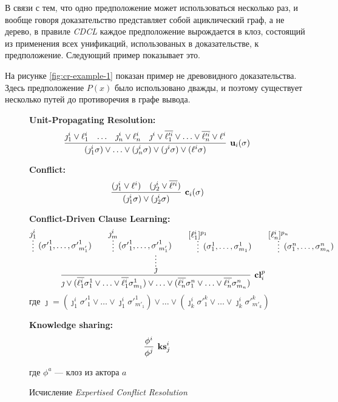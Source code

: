 В связи с тем, что одно предположение может использоваться несколько раз, и вообще говоря доказательство представляет собой ациклический граф, а не дерево, в правиле \emph{CDCL} каждое предположение вырождается в клоз, состоящий из применения всех унификаций, использованых в доказательстве, к предположение. Следующий пример показывает это.
\begin{example}
На рисунке \ref{fig:cr-example-1} показан пример не древовидного доказательства. Здесь предположение $P(x)$ было использовано дважды, и поэтому существует несколько путей до противоречия в графе вывода.
\end{example}


\begin{figure}\begin{calculus}\centering

\textbf{Unit-Propagating Resolution:}
$$
\infer[\upr{i}{\sigma}]
	  {(\jmath_1^i \sigma) \vee \ldots \vee (\jmath_n^i \sigma) \vee 
       (\jmath^i \sigma) \vee (\ell^i \sigma)}
      {\jmath_1^i \vee \ell^i_1 & \ldots & 
       \jmath_n^i \vee \ell^i_n & 
       \jmath^i \vee 
       \overline{\ell'^i_1} \vee \ldots \vee \overline{\ell'^i_n} \vee \ell^i
      }
$$

\bigskip

\textbf{Conflict:}
$$
\infer[\confl{i}{\sigma}]
      {(\jmath_1^i \sigma) \vee (\jmath_2^i \sigma)}
      {(\jmath_1^i \vee \ell^i) & (\jmath_2^i \vee \overline{\ell'^i})}
$$ 

\bigskip

\textbf{Conflict-Driven Clause Learning:} 
$$
\infer[\cdcl{i}{p}]
      { \jmath \vee (\overline{\ell^i_1} \sigma^1_1 \vee \ldots \vee \overline{\ell^i_1} \sigma^1_{m_1}) \vee \ldots \vee (\overline{\ell^i_n} \sigma^n_1 \vee \ldots \vee \overline{\ell^i_n} \sigma^n_{m_n})
      }
	  { \infer*{\jmath}
               { \infer*[({\sigma'}_1^1,\ldots,{\sigma'}_{m'_1}^1)]
                      {}{\jmath^i_1} &  &
                 \infer*[({\sigma'}_1^1,\ldots,{\sigma'}_{m'_1}^1)]
                      {}{\jmath^i_m} &  &
                 \infer*[(\sigma_1^1,\ldots,\sigma_{m_1}^1)]
                      {}{[\ell^i_1]^{\dls{p}{1} } } &  &
                 \infer*[(\sigma_1^n,\ldots,\sigma_{m_n}^n)]
                      {}{[\ell^i_n]^{\dls{p}{n}}}
               }
      }
$$ 
где $\jmath = ({\jmath^i_1} \sigma'^1_1 \vee \ldots \vee \jmath^i_1 \sigma'^1_{m'_1}) \vee \ldots \vee ({\jmath^i_k} \sigma'^k_1 \vee \ldots \vee \jmath^i_k\sigma'^k_{m'_k})$

\bigskip

\textbf{Knowledge sharing:} 
$$
\infer[\kshare{i}{j}]
      {\phi^j}
	  {\phi^i}
$$

где $\phi^a$ --- клоз из актора $a$

\end{calculus}

\caption{Исчисление \emph{Expertised Conflict Resolution}}

\label{fig:ECR}
\end{figure}

